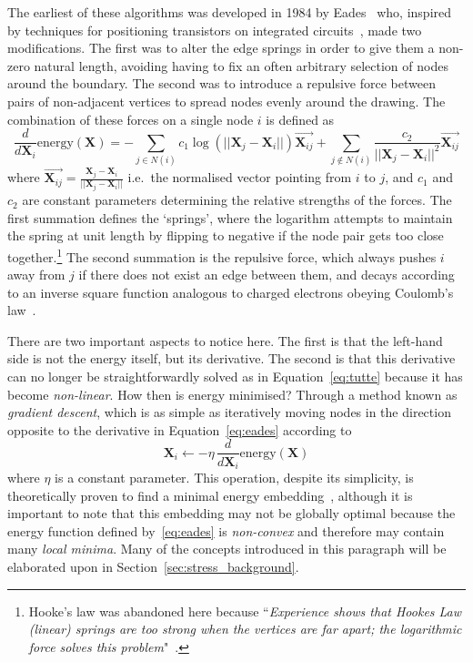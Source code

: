 The earliest of these algorithms was developed in 1984 by Eades~\cite{TODO} who, inspired by techniques for positioning transistors on integrated circuits~\cite{VLSI}, made two modifications. The first was to alter the edge springs in order to give them a non-zero natural length, avoiding having to fix an often arbitrary selection of nodes around the boundary. The second was to introduce a repulsive force between pairs of non-adjacent vertices to spread nodes evenly around the drawing.
The combination of these forces on a single node $i$ is defined as
\begin{equation}
    \frac{d}{d\mathbf{X}_i}\mathrm{energy}(\mathbf{X}) = -\sum_{j\in N(i)}c_1\log(||\mathbf{X}_j-\mathbf{X}_i||)\overrightarrow{\mathbf{X}_{ij}}
    + \sum_{j\notin N(i)}\frac{c_2}{||\mathbf{X}_j-\mathbf{X}_i||^2}\overrightarrow{\mathbf{X}_{ij}}
\label{eq:eades}
\end{equation}
where $\overrightarrow{\mathbf{X}_{ij}} = \frac{\mathbf{X}_j-\mathbf{X}_i}{||\mathbf{X}_j-\mathbf{X}_i||}$ i.e.\ the normalised vector pointing from $i$ to $j$, and $c_1$ and $c_2$ are constant parameters determining the relative strengths of the forces. The first summation defines the `springs', where the logarithm attempts to maintain the spring at unit length by flipping to negative if the node pair gets too close together.\footnote{Hooke's law was abandoned here because ``\emph{Experience shows that Hookes Law (linear) springs are too strong when the vertices are far apart; the logarithmic force solves this problem}"~\cite{eades}.}
The second summation is the repulsive force, which always pushes $i$ away from $j$ if there does not exist an edge between them, and decays according to an inverse square function analogous to charged electrons obeying Coulomb's law~\cite{coulomb}.

There are two important aspects to notice here. The first is that the left-hand side is not the energy itself, but its derivative. The second is that this derivative can no longer be straightforwardly solved as in Equation~\eqref{eq:tutte} because it has become \emph{non-linear}. How then is energy minimised? Through a method known as \emph{gradient descent}, which is as simple as iteratively moving nodes in the direction opposite to the derivative in Equation~\eqref{eq:eades} according to
\begin{equation}
    \mathbf{X}_i \leftarrow -\eta\, \frac{d}{d\mathbf{X}_i}\mathrm{energy}(\mathbf{X})
\label{eq:gradient_descent}
\end{equation}
where $\eta$ is a constant parameter.
This operation, despite its simplicity, is theoretically proven to find a minimal energy embedding~\cite{gradientdescent}, although it is important to note that this embedding may not be globally optimal because the energy function defined by~\eqref{eq:eades} is \emph{non-convex} and therefore may contain many \emph{local minima}. Many of the concepts introduced in this paragraph will be elaborated upon in Section~\ref{sec:stress_background}.

